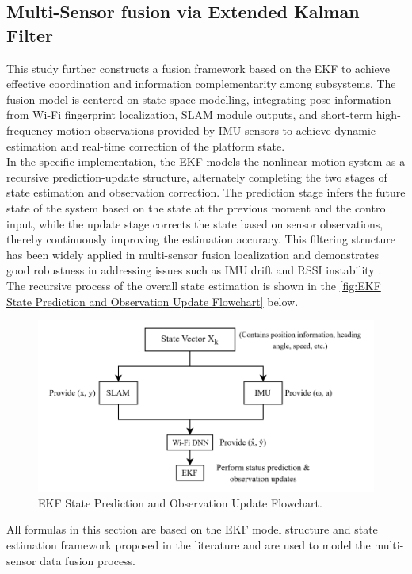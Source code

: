 \documentclass[12pt,a4paper]{article}
\numberwithin{equation}{section}
\begin{document}
\subsection{Multi-Sensor fusion via Extended Kalman Filter}
This study further constructs a fusion framework based on the EKF to achieve effective coordination and information complementarity among subsystems. The fusion model is centered on state space modelling, integrating pose information from Wi-Fi fingerprint localization, SLAM module outputs, and short-term high-frequency motion observations provided by IMU sensors to achieve dynamic estimation and real-time correction of the platform state.\\
In the specific implementation, the EKF models the nonlinear motion system as a recursive prediction-update structure, alternately completing the two stages of state estimation and observation correction. The prediction stage infers the future state of the system based on the state at the previous moment and the control input, while the update stage corrects the state based on sensor observations, thereby continuously improving the estimation accuracy. This filtering structure has been widely applied in multi-sensor fusion localization and demonstrates good robustness in addressing issues such as IMU drift and RSSI instability \cite{zhuang2023multi}.\\
The recursive process of the overall state estimation is shown in the \autoref{fig:EKF State Prediction and Observation Update Flowchart} below.
\begin{figure}[H]
    \centering
    \includegraphics[width=0.85\linewidth]{images/图片1.png}
    \caption{EKF State Prediction and Observation Update Flowchart.}
    \label{fig:EKF State Prediction and Observation Update Flowchart}
\end{figure}
\noindent All formulas in this section are based on the EKF model structure and state estimation framework proposed in the literature \cite{bailey2006consistency,lerro1993tracking,li2013high} and are used to model the multi-sensor data fusion process.\\
\end{document}
